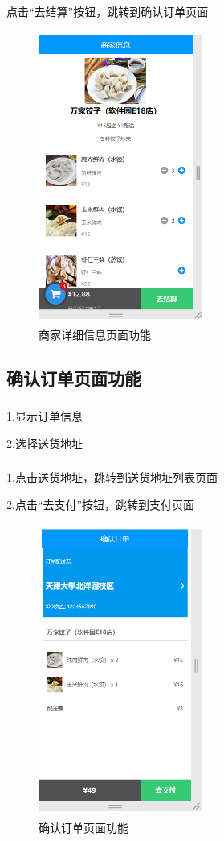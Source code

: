 \subsubsection*{}
点击“去结算”按钮，跳转到确认订单页面
\begin{figure}[H]
    \centering
    \includegraphics[width=5.4cm,height=9.6cm]{figures/2.2.3.png}
    \caption{商家详细信息页面功能}
\end{figure}

\subsection{确认订单页面功能}
\subsubsection*{}
1.显示订单信息

2.选择送货地址
\subsubsection*{}
1.点击送货地址，跳转到送货地址列表页面

2.点击“去支付”按钮，跳转到支付页面
\begin{figure}[H]
    \centering
    \includegraphics[width=5.4cm,height=9.6cm]{figures/2.2.4.png}
    \caption{确认订单页面功能}
\end{figure}


